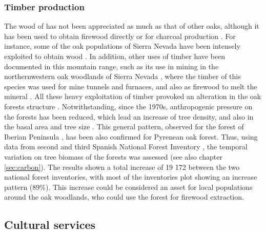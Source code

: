 \subsubsection{Timber production}\label{sec:es:provision-timber}
The wood of \Qp has not been appreciated as much as that of other oaks, although it has been used to obtain firewood directly or for charcoal production \autocites{MontoyaMeson1979SituacionActual}. For instance, some of the oak populations of Sierra Nevada have been intensely exploited to obtain wood \autocites[\emph{e.g.} Robledal de Cáñar, Alpujarras,][]{ValbuenaCarabanaGil2013GeneticResilience,MorenoLlorcaetal2016HistoricalAnalysis}. In addition, other uses of timber have been documented in this mountain range, such as its use in mining in the northernwestern oak woodlands of Sierra Nevada \autocites{Titos1990}, where the timber of this species was used for mine tunnels and furnaces, and also as firewood to melt the mineral \autocites{Titos1990}. All these heavy exploitation of timber provoked an alteration in the oak forests structure \autocite{PerezLuqueetal2020LanduseLegacies}. Notwithstanding, since the 1970s, anthropogenic pressure on the forests has been reduced, which lead an increase of tree density, and also in the basal area and tree size \autocite{GonzalezDiazetal2020BosquesEspanoles}. This general pattern, observed for the forest of Iberian Peninsula \autocite{Astigarragaetal2020EvidenceNon,GonzalezDiazetal2020BosquesEspanoles}, has been also confirmed for Pyrenean oak forest. Thus, using data from second and third Spanish National Forest Inventory \autocites{VillaescusaDiaz1998SegundoInventario,Villanueva2005TercerInventario}, the temporal variation on tree biomass of the \Qp forests was assessed \autocites{PerezLuqueetal2021CarbonSequestration} (see also chapter \ref{sec:carbon}). The results shown a total increase of 19 172 \mgha between the two national forest inventories, with most of the inventories plot showing an increase pattern (89\%). This increase could be considered an asset for local populations around the oak woodlands, who could use the forest for firewood extraction.

\subsection{Cultural services}\label{sec:es:cultural}
